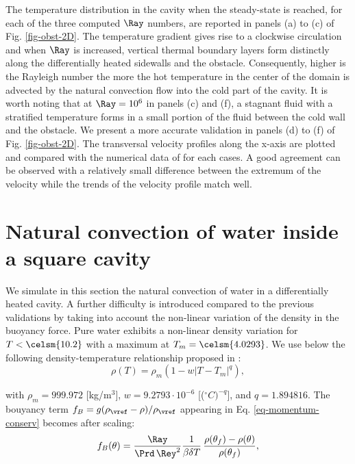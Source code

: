The temperature distribution in the cavity when the steady-state is reached, for each of the three computed $\Ray$ numbers, are reported in panels (a) to (c) of Fig. \ref{fig-obst-2D}.
The temperature gradient gives rise to a clockwise circulation and when $\Ray$ is increased, vertical thermal boundary layers form distinctly along the differentially heated sidewalls and the obstacle.
Consequently, 
higher is the Rayleigh number the more the hot temperature in the center of the domain is advected by the natural convection flow into the cold part of the cavity. 
It is worth noting that at $\Ray = 10^6$ in panels (c) and (f), a stagnant fluid with a stratified temperature forms in a small portion of the fluid between the cold wall and the obstacle.
We present a more accurate validation in panels (d) to (f) of Fig. \ref{fig-obst-2D}.
The transversal velocity profiles along the x-axis are plotted and compared with the numerical data of \cite{Raluca2013} for each cases. 
A good agreement can be observed with a relatively small difference between the extremum of the velocity while the trends of the velocity profile match well.

\section{Natural convection of water inside a square cavity}\label{sec: natconv-water}
We simulate in this section the natural convection of water in a differentially heated cavity. 
A further difficulty is introduced compared to the previous validations by taking into account the non-linear variation of the density in the buoyancy force.
Pure water exhibits a non-linear density variation for $T< \celsm{10.2}$ with a maximum at $T_m= \celsm{4.0293}$. 
We use below the following density-temperature relationship  proposed in \cite{Gebhart1977}:
\begin{equation}\label{eq-dens-nonlin}
\rho(T)=\rho_m \left(1 - w \left|T - T_m\right|^q\right),
\end{equation}

\noindent with $\rho_m=999.972$ [kg/m$^3$], $w=9.2793\cdot 10^{-6}$ [($^\circ C)^{-q}$], and $q=1.894816$.
The bouyancy term $f_B = g(\rho_\vref-\rho)/\rho_\vref$ appearing in Eq. \eqref{eq-momentum-conserv}  becomes after scaling:
\begin{equation}
f_B(\theta) = \frac{\Ray}{\Prd \, \Rey^2} \frac{1}{\beta \delta T}\, \frac{\rho(\theta_f)-\rho(\theta)}{\rho(\theta_f)},
\label{eq-fBnonlin}
\end{equation}

